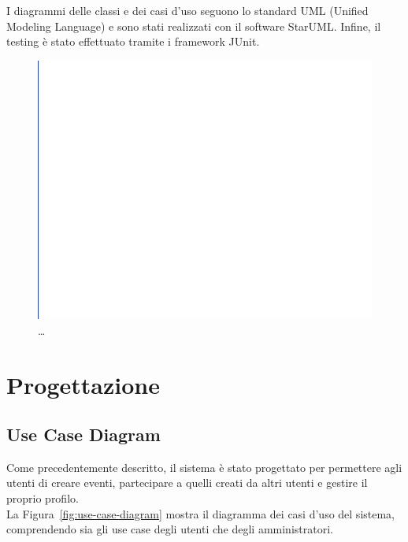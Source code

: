 \documentclass[11pt]{article}
\begin{document}
            I diagrammi delle classi e dei casi d’uso seguono lo standard UML (Unified Modeling Language) e sono stati realizzati con il software StarUML. Infine, il testing è stato effettuato tramite i framework JUnit.

            \begin{figure}[H]
                \centering
                \includegraphics[width=\textwidth]{blank} %
                \caption{\dots}
                \label{fig:blank} %
            \end{figure}

    \section{Progettazione} \label{sec:progettazione}

        \subsection{Use Case Diagram} \label{subsec:use-case-diagram}

            Come precedentemente descritto, il sistema è stato progettato per permettere agli utenti di creare eventi, partecipare a quelli creati da altri utenti e gestire il proprio profilo. \\
            La Figura~\ref{fig:use-case-diagram} mostra il diagramma dei casi d'uso del sistema, comprendendo sia gli use case degli utenti che degli amministratori.
\end{document}
